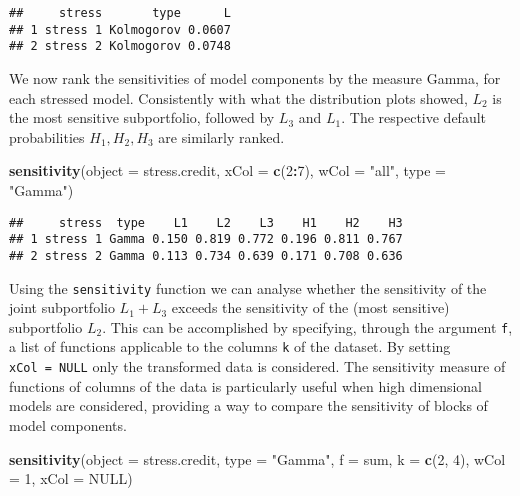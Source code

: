 \documentclass[
]{article}
\newenvironment{Shaded}{\begin{snugshade}}{\end{snugshade}}
\newcommand{\DataTypeTok}[1]{\textcolor[rgb]{0.13,0.29,0.53}{#1}}
\newcommand{\DecValTok}[1]{\textcolor[rgb]{0.00,0.00,0.81}{#1}}
\newcommand{\KeywordTok}[1]{\textcolor[rgb]{0.13,0.29,0.53}{\textbf{#1}}}
\newcommand{\NormalTok}[1]{#1}
\newcommand{\OperatorTok}[1]{\textcolor[rgb]{0.81,0.36,0.00}{\textbf{#1}}}
\newcommand{\OtherTok}[1]{\textcolor[rgb]{0.56,0.35,0.01}{#1}}
\newcommand{\StringTok}[1]{\textcolor[rgb]{0.31,0.60,0.02}{#1}}
\begin{document}
\begin{verbatim}
##     stress       type      L
## 1 stress 1 Kolmogorov 0.0607
## 2 stress 2 Kolmogorov 0.0748
\end{verbatim}

We now rank the sensitivities of model components by the measure Gamma, for each stressed model. Consistently with what the distribution plots showed, \(L_2\) is the most sensitive subportfolio, followed by \(L_3\) and \(L_1\). The respective default probabilities \(H_1,H_2,H_3\) are similarly ranked.

\begin{Shaded}
\begin{Highlighting}[]
\KeywordTok{sensitivity}\NormalTok{(}\DataTypeTok{object =}\NormalTok{ stress.credit, }\DataTypeTok{xCol =} \KeywordTok{c}\NormalTok{(}\DecValTok{2}\OperatorTok{:}\DecValTok{7}\NormalTok{), }\DataTypeTok{wCol =} \StringTok{"all"}\NormalTok{, }\DataTypeTok{type =} \StringTok{"Gamma"}\NormalTok{)}
\end{Highlighting}
\end{Shaded}

\begin{verbatim}
##     stress  type    L1    L2    L3    H1    H2    H3
## 1 stress 1 Gamma 0.150 0.819 0.772 0.196 0.811 0.767
## 2 stress 2 Gamma 0.113 0.734 0.639 0.171 0.708 0.636
\end{verbatim}

Using the \texttt{sensitivity} function we can analyse whether the sensitivity of the joint subportfolio \(L_1 + L_3\) exceeds the sensitivity of the (most sensitive) subportfolio \(L_2\). This can be accomplished by specifying, through the argument \texttt{f}, a list of functions applicable to the columns \texttt{k} of the dataset. By setting \texttt{xCol\ =\ NULL} only the transformed data is considered. The sensitivity measure of functions of columns of the data is particularly useful when high dimensional models are considered, providing a way to compare the sensitivity of blocks of model components.

\begin{Shaded}
\begin{Highlighting}[]
\KeywordTok{sensitivity}\NormalTok{(}\DataTypeTok{object =}\NormalTok{ stress.credit, }\DataTypeTok{type =} \StringTok{"Gamma"}\NormalTok{, }\DataTypeTok{f =}\NormalTok{ sum, }\DataTypeTok{k =} \KeywordTok{c}\NormalTok{(}\DecValTok{2}\NormalTok{, }\DecValTok{4}\NormalTok{), }
    \DataTypeTok{wCol =} \DecValTok{1}\NormalTok{, }\DataTypeTok{xCol =} \OtherTok{NULL}\NormalTok{)}
\end{Highlighting}
\end{Shaded}
\end{document}
